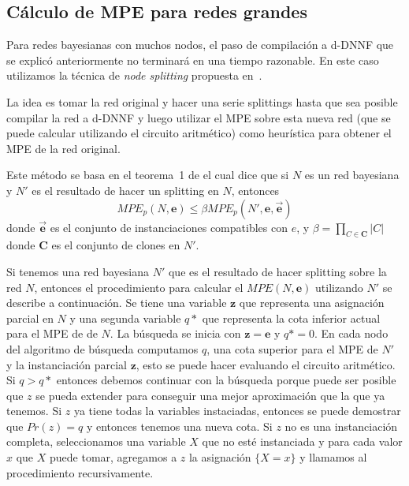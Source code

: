 \documentclass[11pt, letterpaper]{article}
\begin{document}

\subsection{Cálculo de MPE para redes grandes}
\label{sec:calculo-de-mpe}
Para redes bayesianas con muchos nodos, el paso de compilación a
d-DNNF que se explicó anteriormente no terminará en una tiempo
razonable. En este caso utilizamos la técnica de \textsl{node
  splitting} propuesta en~\cite{ChoiChaviraDarwiche07}.

La idea es tomar la red original y hacer una serie splittings hasta
que sea posible compilar la red a d-DNNF y luego utilizar el MPE sobre
esta nueva red (que se puede calcular utilizando el circuito
aritmético) como heurística para obtener el MPE de la red original.

Este método se basa en el teorema~1 de \cite{ChoiChaviraDarwiche07} el
cual dice que si $N$ es un red bayesiana y $N'$ es el resultado de
hacer un splitting en $N$, entonces
\begin{equation}
  \label{eq:2}
  MPE_p(N,\mathbf{e}) \leq \beta MPE_p(N', \mathbf{e}, \vec{\mathbf{e}})
\end{equation}
donde $\vec{\mathbf{e}}$ es el conjunto de instanciaciones compatibles con $e$,
y $\beta = \prod_{C \in \mathbf{C}} |C|$ donde $\mathbf{C}$ es el conjunto de
clones en $N'$.

Si tenemos una red bayesiana $N'$ que es el resultado de hacer
splitting sobre la red $N$, entonces el procedimiento para calcular el
$MPE(N,\mathbf{e})$ utilizando $N'$ se describe a continuación. Se
tiene una variable $\mathbf{z}$ que representa una asignación parcial
en $N$ y una segunda variable $q*$ que representa la cota inferior
actual para el MPE de de $N$. La búsqueda se inicia con $\mathbf{z} =
\mathbf{e}$ y $q* = 0$. En cada nodo del algoritmo de búsqueda
computamos $q$, una cota superior para el MPE de $N'$ y la
instanciación parcial $\mathbf{z}$, esto se puede hacer evaluando el
circuito aritmético. Si $q>q*$ entonces debemos continuar con la
búsqueda porque puede ser posible que $z$ se pueda extender para
conseguir una mejor aproximación que la que ya tenemos. Si $z$ ya
tiene todas la variables instaciadas, entonces se puede demostrar que
$Pr(z) = q$ y entonces tenemos una nueva cota. Si $z$ no es una
instanciación completa, seleccionamos una variable $X$ que no esté
instanciada y para cada valor $x$ que $X$ puede tomar, agregamos a $z$
la asignación $\{ X = x \}$ y llamamos al procedimiento recursivamente.
\end{document}
